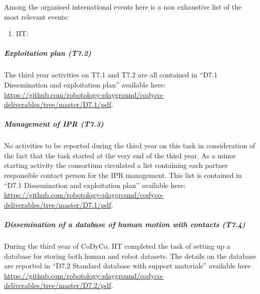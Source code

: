 Among the organised international events here is a non exhaustive list of the most relevant events:

\begin{enumerate}

\item IIT: 

\end{enumerate} 



\subparagraph{Exploitation plan (T7.2)}

The third year activities on T7.1 and T7.2 are all contained in ``D7.1 Dissemination and exploitation plan'' available here: \url{https://github.com/robotology-playground/codyco-deliverables/tree/master/D7.1/pdf}.

\subparagraph{Management of IPR (T7.3)}

No activities to be reported during the third year on this task in consideration of the fact that the task started at the very end of the third year. As a minor starting activity the consortium circulated a list containing each partner responsible contact person for the IPR management. This list is contained in ``D7.1 Dissemination and exploitation plan'' available here: \url{https://github.com/robotology-playground/codyco-deliverables/tree/master/D7.1/pdf}.

\subparagraph{Dissemination of a database of human motion with contacts (T7.4)}

During the third year of CoDyCo, IIT completed the task of setting up a database for storing both human and robot datasets. The details on the database are reported in ``D7.2 Standard database with support materials'' available here \url{https://github.com/robotology-playground/codyco-deliverables/tree/master/D7.2/pdf}. 

